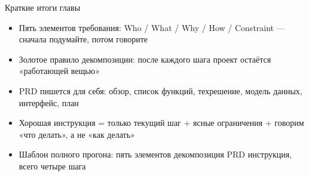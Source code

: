 \begin{tcbsummary}{Краткие итоги главы}
\begin{itemize}
  \item Пять элементов требования: Who / What / Why / How / Constraint — сначала подумайте, потом говорите
  \item Золотое правило декомпозиции: после каждого шага проект остаётся «работающей вещью»
  \item PRD пишется для себя: обзор, список функций, техрешение, модель данных, интерфейс, план
  \item Хорошая инструкция = только текущий шаг + ясные ограничения + говорим «что делать», а не «как делать»
  \item Шаблон полного прогона: пять элементов декомпозиция PRD инструкция, всего четыре шага
\end{itemize}

\end{tcbsummary}
